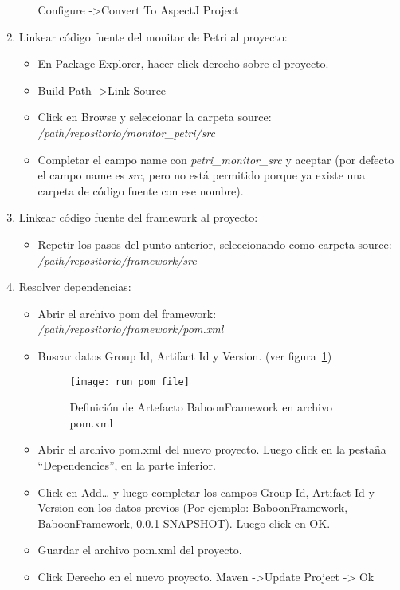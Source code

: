 \begin{enumerate}
\begin{itemize}
          Configure -\textgreater  Convert To AspectJ Project
        \end{itemize}
   \item Linkear código fuente del monitor de Petri al proyecto:
        \begin{itemize}
          \item En Package Explorer, hacer click derecho sobre el proyecto.
          \item Build Path -\textgreater Link Source
          \item Click en Browse y seleccionar la carpeta source:               
          \emph{/path/repositorio/monitor\_petri/src}
          \item Completar el campo name con \emph{petri\_monitor\_src} y aceptar
          (por defecto el campo name es \emph{src}, pero no está
          permitido porque ya existe una carpeta de código fuente con ese nombre).
        \end{itemize}
   \item Linkear código fuente del framework al proyecto: 
        \begin{itemize}
          \item Repetir los pasos del punto anterior, seleccionando como carpeta
          source: \emph{/path/repositorio/framework/src}
        \end{itemize}
   \item Resolver dependencias:
        \begin{itemize}
          \item Abrir el archivo pom del framework:
                \emph{/path/repositorio/framework/pom.xml}
          \item Buscar datos Group Id, Artifact Id y Version. (ver
          figura~\ref{fig:run_pom_file}) 
            \begin{figure}[H]
                \centering
                \texttt{[image: run\_pom\_file]}
                \caption{Definición de Artefacto BaboonFramework en archivo
                pom.xml}
            \label{fig:run_pom_file}
                \end{figure}
          \item Abrir el archivo pom.xml del nuevo proyecto. Luego click en la
          pestaña “Dependencies”, en la parte inferior.
          \item Click en Add… y  luego completar los campos Group Id, Artifact
          Id y Version con los datos previos (Por ejemplo:
          BaboonFramework, BaboonFramework, 0.0.1-SNAPSHOT). Luego click en OK.
          \item Guardar el archivo pom.xml del proyecto.
          \item Click Derecho en el nuevo proyecto. Maven -\textgreater Update Project -\textgreater
          Ok
        \end{itemize}
\end{enumerate}


